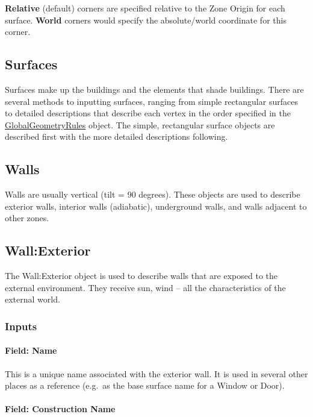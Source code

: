 \textbf{Relative} (default) corners are specified relative to the Zone Origin for each surface. \textbf{World} corners would specify the absolute/world coordinate for this corner.

\subsection{Surfaces}\label{surfaces-1}

Surfaces make up the buildings and the elements that shade buildings. There are several methods to inputting surfaces, ranging from simple rectangular surfaces to detailed descriptions that describe each vertex in the order specified in the \hyperref[globalgeometryrules]{GlobalGeometryRules} object. The simple, rectangular surface objects are described first with the more detailed descriptions following.

\subsection{Walls}\label{walls}

Walls are usually vertical (tilt = 90 degrees). These objects are used to describe exterior walls, interior walls (adiabatic), underground walls, and walls adjacent to other zones.

\subsection{Wall:Exterior}\label{wallexterior}

The Wall:Exterior object is used to describe walls that are exposed to the external environment. They receive sun, wind -- all the characteristics of the external world.

\subsubsection{Inputs}\label{inputs-4-035}

\paragraph{Field: Name}\label{field-name-047}

This is a unique name associated with the exterior wall. It is used in several other places as a reference (e.g.~as the base surface name for a Window or Door).

\paragraph{Field: Construction Name}\label{field-construction-name-003}

